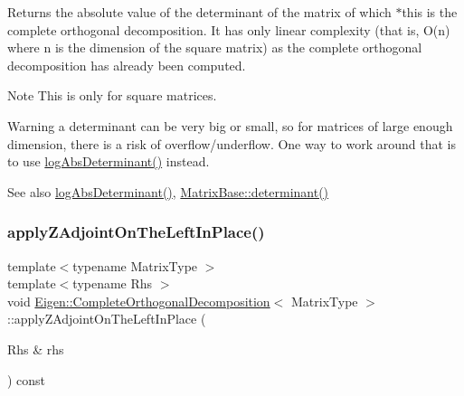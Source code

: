 \begin{DoxyReturn}{Returns}
the absolute value of the determinant of the matrix of which $\ast$this is the complete orthogonal decomposition. It has only linear complexity (that is, O(n) where n is the dimension of the square matrix) as the complete orthogonal decomposition has already been computed.
\end{DoxyReturn}
\begin{DoxyNote}{Note}
This is only for square matrices.
\end{DoxyNote}
\begin{DoxyWarning}{Warning}
a determinant can be very big or small, so for matrices of large enough dimension, there is a risk of overflow/underflow. One way to work around that is to use \mbox{\hyperlink{class_eigen_1_1_complete_orthogonal_decomposition_ad59d6dc78dab52a0038ac372b4a72c0d}{log\+Abs\+Determinant()}} instead.
\end{DoxyWarning}
\begin{DoxySeeAlso}{See also}
\mbox{\hyperlink{class_eigen_1_1_complete_orthogonal_decomposition_ad59d6dc78dab52a0038ac372b4a72c0d}{log\+Abs\+Determinant()}}, \mbox{\hyperlink{class_eigen_1_1_matrix_base_a7ad8f77004bb956b603bb43fd2e3c061}{Matrix\+Base\+::determinant()}} 
\end{DoxySeeAlso}
\mbox{\label{class_eigen_1_1_complete_orthogonal_decomposition_a0a89641e0b4ea92c515405f2a31e6abe}} 
\subsubsection{\texorpdfstring{applyZAdjointOnTheLeftInPlace()}{applyZAdjointOnTheLeftInPlace()}}
{\footnotesize\ttfamily template$<$typename Matrix\+Type $>$ \\
template$<$typename Rhs $>$ \\
void \mbox{\hyperlink{class_eigen_1_1_complete_orthogonal_decomposition}{Eigen\+::\+Complete\+Orthogonal\+Decomposition}}$<$ Matrix\+Type $>$\+::apply\+Z\+Adjoint\+On\+The\+Left\+In\+Place (\begin{DoxyParamCaption}\item[{Rhs \&}]{rhs }\end{DoxyParamCaption}) const\hspace{0.3cm}{\ttfamily [protected]}}

